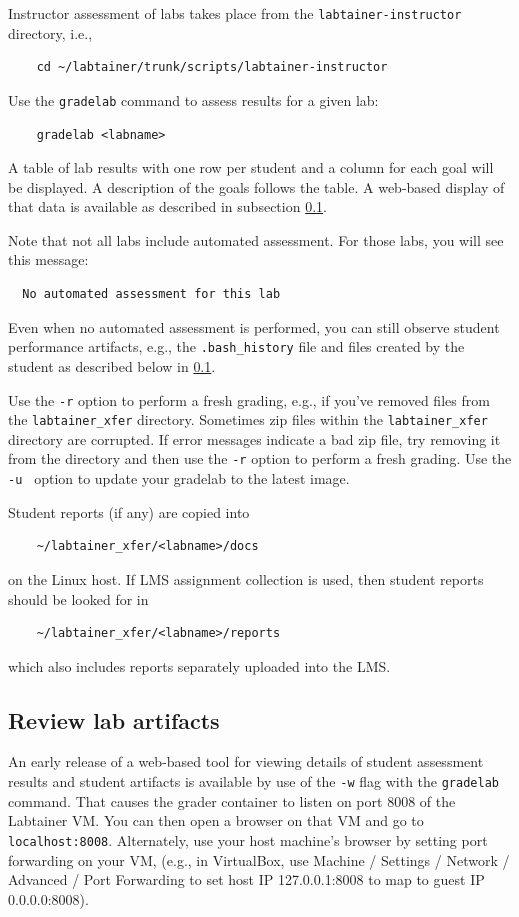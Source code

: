 \documentclass[12pt]{article}
\begin{document}
Instructor assessment of labs takes place from the {\tt labtainer-instructor} directory, i.e.,
\begin{verbatim}
    cd ~/labtainer/trunk/scripts/labtainer-instructor
\end{verbatim}

\noindent Use the {\tt gradelab} command to assess results for a given lab:
\begin{verbatim}
    gradelab <labname>
\end{verbatim}
\noindent A table of lab results with one row per student and
a column for each goal will be displayed.  A description of the goals follows the table.
A web-based display of that data is available as described in subsection \ref{review-artifacts}.

Note that not all labs include automated assessment.  For those labs, you will see this
message:
\begin{verbatim}
  No automated assessment for this lab
\end{verbatim}
\noindent Even when no automated assessment is performed, you can still observe student performance
artifacts, e.g., the {\tt .bash\_history} file and files created by the student as described below in \ref{review-artifacts}.

Use the {\tt -r} option to perform a fresh grading, e.g., if you've removed files from the {\tt labtainer\_xfer} directory.
Sometimes zip files within the {\tt labtainer\_xfer} directory are corrupted.  If error messages indicate a bad zip file,
try removing it from the directory and then use the {\tt -r} option to perform a fresh grading.
Use the {\tt -u } option to update your gradelab to the latest image.

Student reports (if any) are  copied into 
\begin{verbatim}
    ~/labtainer_xfer/<labname>/docs
\end{verbatim}
\noindent on the Linux host.  If LMS assignment collection is used, then student reports should
be looked for in 
\begin{verbatim}
    ~/labtainer_xfer/<labname>/reports
\end{verbatim}
\noindent which also includes reports separately uploaded into the LMS.

\subsection{Review lab artifacts}
\label{review-artifacts}
An early release of a web-based tool for viewing details of student assessment
results and student artifacts is available by use of the {\tt -w} flag with the {\tt gradelab} command.  That causes
the grader container to listen on port 8008 of the Labtainer VM.  You can then open
a browser on that VM and go to {\tt localhost:8008}.  Alternately, use your host machine's browser
by setting port forwarding on your VM, (e.g., in VirtualBox, use Machine / Settings / Network / Advanced /
Port Forwarding to set host IP 127.0.0.1:8008 to map to guest IP 0.0.0.0:8008).
\end{document}
